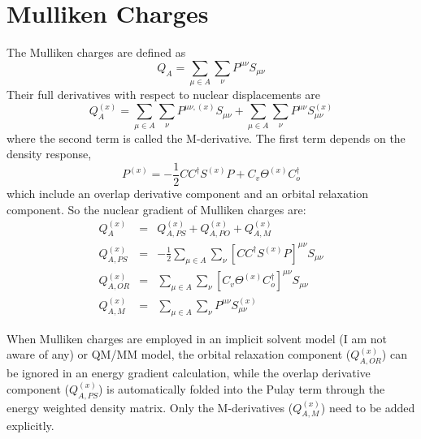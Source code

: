 \documentclass[aip,jcp,preprint,superscriptaddress,amsmath,amssymb]{revtex4-1}
\begin{document}
\section{Mulliken Charges} 

The Mulliken charges are defined as 
\begin{equation}
Q_A = \sum_{\mu \in A} \sum_{\nu}   P^{\mu \nu} S_{\mu \nu} 
\end{equation}
Their full derivatives with respect to nuclear displacements are
\begin{equation}
Q_A ^{(x)} = \sum_{\mu \in A} \sum_{\nu}   P^{\mu \nu,(x)}  S_{\mu \nu}  + \sum_{\mu \in A} \sum_{\nu}   P^{\mu \nu} S_{\mu \nu}^{(x)} 
\end{equation}
where the second term is called the M-derivative.     
The first term depends on the density response, 
\begin{equation}
P^{(x)} =  - \frac{1}{2} CC^{\dagger} S^{(x)} P + C_v \Theta^{(x)} C_o^{\dagger} 
\end{equation}
which include an overlap derivative component and an orbital relaxation component.    So the nuclear gradient of Mulliken charges are:
\begin{eqnarray}
Q_A ^{(x)} & = & Q_{A,PS} ^{(x)} + Q_{A,PO} ^{(x)} + Q_{A,M} ^{(x)}         \\
Q_{A,PS}^{(x)} & = & - \frac{1}{2}  \sum_{\mu \in A} \sum_{\nu}  \left[  CC^{\dagger} S^{(x)} P  \right] ^{\mu \nu}  S_{\mu \nu}  \\
Q_{A,OR} ^{(x)} & = & \sum_{\mu \in A} \sum_{\nu}  \left[   C_v \Theta^{(x)} C_o^{\dagger}  \right] ^{\mu \nu}  S_{\mu \nu}  \\
Q_{A,M} ^{(x)}   & = & \sum_{\mu \in A} \sum_{\nu}   P^{\mu \nu} S_{\mu \nu}^{(x)} 
\end{eqnarray}

When Mulliken charges are employed in an implicit solvent model (I am not aware of any) or QM/MM model, 
the orbital relaxation component ($Q_{A,OR} ^{(x)}$) can be ignored in an energy gradient calculation, 
while the overlap derivative component ($Q_{A,PS}^{(x)}$) is automatically folded into the Pulay term 
through the energy weighted density matrix.   Only the M-derivatives ($Q_{A,M} ^{(x)}$) need to be added explicitly.  
\end{document}
